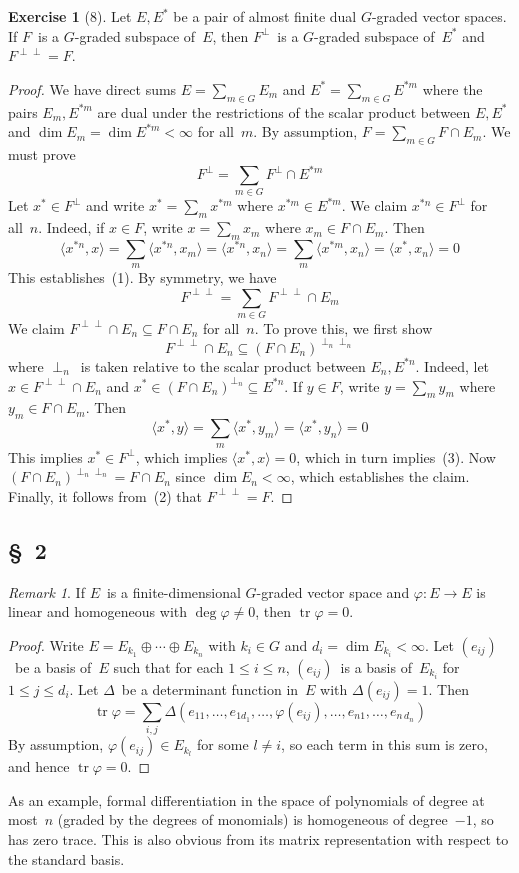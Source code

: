 \documentclass[letterpaper,12pt]{article}
\DeclareMathOperator{\tr}{tr}
\newcommand{\sect}{\cap}
\newcommand{\dsum}{\oplus}
\newcommand{\sprod}[2]{\langle#1,#2\rangle}
\newcommand{\oc}[1]{#1^{\perp}}
\newcommand{\occ}[1]{#1^{\perp\perp}}
\theoremstyle{definition}
\newtheorem*{exer}{Exercise}
\theoremstyle{remark}
\newtheorem*{rmk}{Remark}
\begin{document}
\begin{exer}[8]
Let \(E,E^*\) be a pair of almost finite dual \(G\)-graded vector spaces. If \(F\)~is a \(G\)-graded subspace of~\(E\), then \(\oc{F}\)~is a \(G\)-graded subspace of~\(E^*\) and \(\occ{F}=F\).
\end{exer}
\begin{proof}
We have direct sums \(E=\sum_{m\in G}E_m\) and \(E^*=\sum_{m\in G}E^{*m}\) where the pairs \(E_m,E^{*m}\) are dual under the restrictions of the scalar product between \(E,E^*\) and \(\dim E_m=\dim E^{*m}<\infty\) for all~\(m\). By assumption, \(F=\sum_{m\in G}F\sect E_m\).
We must prove
\[\oc{F}=\sum_{m\in G}\oc{F}\sect E^{*m}\tag{1}\]
Let \(x^*\in\oc{F}\) and write \(x^*=\sum_m x^{*m}\) where \(x^{*m}\in E^{*m}\). We claim \(x^{*n}\in\oc{F}\) for all~\(n\). Indeed, if \(x\in F\), write \(x=\sum_m x_m\) where \(x_m\in F\sect E_m\). Then
\[\sprod{x^{*n}}{x}=\sum_m\sprod{x^{*n}}{x_m}=\sprod{x^{*n}}{x_n}=\sum_m\sprod{x^{*m}}{x_n}=\sprod{x^*}{x_n}=0\]
This establishes~(1). By symmetry, we have
\[\occ{F}=\sum_{m\in G}\occ{F}\sect E_m\tag{2}\]
We claim \(\occ{F}\sect E_n\subseteq F\sect E_n\) for all~\(n\). To prove this, we first show
\[\occ{F}\sect E_n\subseteq(F\sect E_n)^{\perp_n\perp_n}\tag{3}\]
where \(\perp_n\)~is taken relative to the scalar product between \(E_n,E^{*n}\). Indeed, let \(x\in\occ{F}\sect E_n\) and \(x^*\in(F\sect E_n)^{\perp_n}\subseteq E^{*n}\). If \(y\in F\), write \(y=\sum_m y_m\) where \(y_m\in F\sect E_m\). Then
\[\sprod{x^*}{y}=\sum_m\sprod{x^*}{y_m}=\sprod{x^*}{y_n}=0\]
This implies \(x^*\in\oc{F}\), which implies \(\sprod{x^*}{x}=0\), which in turn implies~(3). Now \((F\sect E_n)^{\perp_n\perp_n}=F\sect E_n\) since \(\dim E_n<\infty\), which establishes the claim. Finally, it follows from~(2) that \(\occ{F}=F\).
\end{proof}

\subsection*{\S~2}
\begin{rmk}
If \(E\)~is a finite-dimensional \(G\)-graded vector space and \(\varphi:E\to E\) is linear and homogeneous with \(\deg\varphi\ne 0\), then \(\tr\varphi=0\).
\end{rmk}
\begin{proof}
Write \(E=E_{k_1}\dsum\cdots\dsum E_{k_n}\) with \(k_i\in G\) and \(d_i=\dim E_{k_i}<\infty\). Let \((e_{ij})\)~be a basis of~\(E\) such that for each \(1\le i\le n\), \((e_{ij})\)~is a basis of~\(E_{k_i}\) for \(1\le j\le d_i\). Let \(\Delta\)~be a determinant function in~\(E\) with \(\Delta(e_{ij})=1\). Then
\[\tr\varphi=\sum_{i,j}\Delta(e_{11},\ldots,e_{1d_1},\ldots,\varphi(e_{ij}),\ldots,e_{n1},\ldots,e_{n\,d_n})\]
By assumption, \(\varphi(e_{ij})\in E_{k_l}\) for some \(l\ne i\), so each term in this sum is zero, and hence \(\tr\varphi=0\).
\end{proof}
\noindent As an example, formal differentiation in the space of polynomials of degree at most~\(n\) (graded by the degrees of monomials) is homogeneous of degree~\(-1\), so has zero trace. This is also obvious from its matrix representation with respect to the standard basis.
\end{document}
